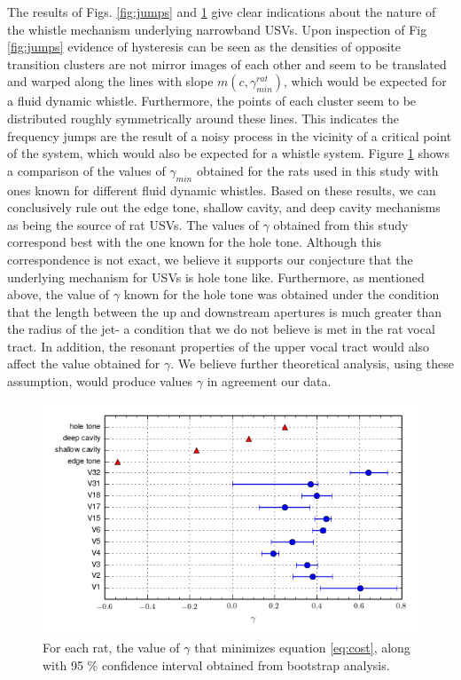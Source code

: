 \documentclass[twocolumn, prl]{revtex4}
\begin{document}
The results of Figs. \ref{fig:jumps} and \ref{fig:gamma_error} give clear indications about the nature of the whistle mechanism underlying narrowband USVs. Upon inspection of Fig \ref{fig:jumps} evidence of hysteresis can be seen as the densities of opposite transition clusters are not mirror images of each other and seem to be translated and warped along the lines with slope $m\left(c,\gamma_{min}^{rat}\right)$, which would be expected for a fluid dynamic whistle. Furthermore, the points of each cluster seem to be distributed roughly symmetrically around these lines. This indicates the frequency jumps are the result of a noisy process in the vicinity of a critical point of the system, which would also be expected for a whistle system. Figure \ref{fig:gamma_error} shows a comparison of the values of $\gamma_{min}$ obtained for the rats used in this study with ones known for different fluid dynamic whistles. Based on these results, we can conclusively rule out the edge tone, shallow cavity, and deep cavity mechanisms as being the source of rat USVs. The values of $\gamma$ obtained from this study correspond best with the one known for the hole tone. Although this correspondence is not exact, we believe it supports our conjecture that the underlying mechanism for USVs is hole tone like. Furthermore, as mentioned above, the value of $\gamma$ known for the hole tone was obtained under the condition that the length between the up and downstream apertures is much greater than the radius of the jet- a condition that we do not believe is met in the rat vocal tract. In addition, the resonant properties of the upper vocal tract would also affect the value obtained for $\gamma$. We believe further theoretical analysis, using these assumption, would produce values $\gamma$ in agreement our data.
\begin{figure}
\begin{center}
\includegraphics[width=\columnwidth]{gamma_error.png}
\caption{\label{fig:gamma_error}For each rat, the value of $\gamma$ that minimizes equation \ref{eq:cost}, along with 95 \% confidence interval obtained from bootstrap analysis.} \end{center}
\end{figure}


\end{document}
